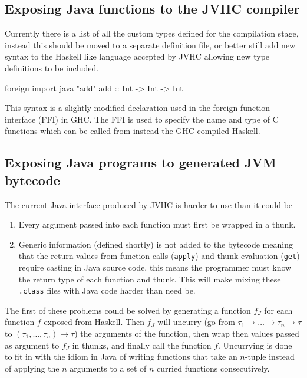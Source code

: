 \documentclass[float=false, crop=false]{standalone}
\begin{document}
\subsection{Exposing Java functions to the JVHC compiler}

Currently there is a list of all the custom types defined for the compilation stage,
instead this should be moved to a separate definition file, or better still 
add new syntax to the Haskell like language accepted by JVHC allowing new type
definitions to be included.

\begin{HaskellLst}
foreign import java "add" add :: Int -> Int -> Int
\end{HaskellLst}
This syntax is a slightly modified declaration used in the foreign function interface (FFI) \cite{ghc_ffi} 
in GHC. The FFI is used to specify the name and type of C functions which can be called from 
instead the GHC compiled Haskell.

\subsection{Exposing Java programs to generated JVM bytecode}

The current Java interface produced by JVHC is harder to use than it could be
\begin{enumerate}
  \item Every argument passed into each function must first be wrapped in a thunk. 
  \item Generic information (defined shortly) is not added to the bytecode meaning that
the return values from function calls (\texttt{apply}) and thunk evaluation 
(\texttt{get}) require casting in Java source code, this means the programmer
must know the return type of each function and thunk. This will
make mixing these \verb|.class| files with Java code harder than need be.
\end{enumerate}

The first of these problems could be solved by generating a function $f_J$ for each 
function $f$ exposed from Haskell. Then $f_J$ will uncurry
(go from \mbox{$\tau_1 \rightarrow \dotsc \rightarrow \tau_n \rightarrow \tau$} to
\mbox{$(\tau_1,\dotsc,\tau_n) \rightarrow \tau$}) the arguments of the function, then 
wrap then values passed as argument to $f_J$ in thunks, and finally call the function $f$. 
Uncurrying is done to fit in with the idiom in Java of writing functions that take 
an $n$-tuple instead of applying the $n$ arguments to a set of $n$ curried functions
consecutively. 
\end{document}

